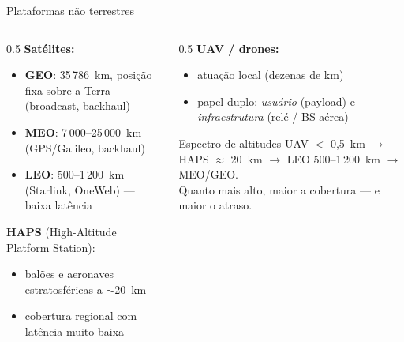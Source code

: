 \documentclass[aspectratio=169,11pt]{beamer}
\begin{document}
\begin{frame}{Plataformas não terrestres}
  \begin{columns}
    \begin{column}{0.5\textwidth}
      \textbf{Satélites:}
      \begin{itemize}
        \item \textbf{GEO}: 35\,786~km, posição fixa sobre a Terra (broadcast, backhaul)
        \item \textbf{MEO}: 7\,000--25\,000~km (GPS/Galileo, backhaul)
        \item \textbf{LEO}: 500--1\,200~km (Starlink, OneWeb) --- baixa latência
      \end{itemize}
      \textbf{HAPS} (High-Altitude Platform Station):
      \begin{itemize}
        \item balões e aeronaves estratosféricas a $\sim$20~km
        \item cobertura regional com latência muito baixa
      \end{itemize}
    \end{column}
    \begin{column}{0.5\textwidth}
      \textbf{UAV / drones:}
      \begin{itemize}
        \item atuação local (dezenas de km)
        \item papel duplo: \emph{usuário} (payload) e \emph{infraestrutura} (relé / BS aérea)
      \end{itemize}
      \begin{block}{Espectro de altitudes}
        UAV $<$ 0,5~km $\rightarrow$ HAPS $\approx$ 20~km $\rightarrow$ LEO 500--1\,200~km $\rightarrow$ MEO/GEO.\\
        Quanto mais alto, maior a cobertura --- e maior o atraso.
      \end{block}
    \end{column}
  \end{columns}
\end{frame}
\end{document}
